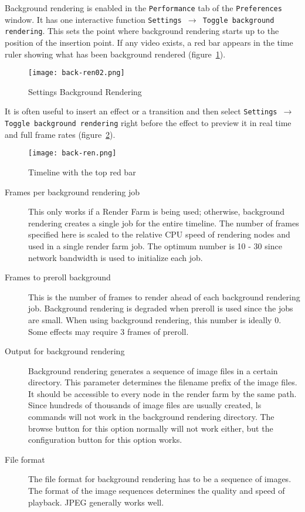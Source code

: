 Background rendering is enabled in the \texttt{Performance} tab of
the \texttt{Preferences} window. It has one interactive function
\texttt{Settings $\rightarrow$ Toggle background rendering}. This
sets the point where background rendering starts up to the position
of the insertion point. If any video exists, a red bar appears in
the time ruler showing what has been background rendered
(figure~\ref{fig:back-ren02}).

\begin{figure}[htpb] \centering
  \texttt{[image: back-ren02.png]}
  \caption{Settings Background Rendering}
  \label{fig:back-ren02}
\end{figure}

It is often useful to insert an effect or a transition and then
select \texttt{Settings $\rightarrow$ Toggle background rendering}
right before the effect to preview it in real time and full frame
rates (figure~\ref{fig:back-ren}).

\begin{figure}[htpb] \centering
  \texttt{[image: back-ren.png]}
  \caption{Timeline with the top red bar}
  \label{fig:back-ren}
\end{figure}

\begin{description}
\item[Frames per background rendering job] This only works if a
  Render Farm is being used; otherwise, background rendering creates a
  single job for the entire timeline. The number of frames specified
  here is scaled to the relative CPU speed of rendering nodes and used
  in a single render farm job. The optimum number is 10 - 30 since
  network bandwidth is used to initialize each job.
\item[Frames to preroll background] This is the number of frames to
  render ahead of each background rendering job. Background rendering
  is degraded when preroll is used since the jobs are small. When
  using background rendering, this number is ideally 0. Some effects
  may require 3 frames of preroll.
\item[Output for background rendering] Background rendering
  generates a sequence of image files in a certain directory. This
  parameter determines the filename prefix of the image files. It
  should be accessible to every node in the render farm by the same
  path. Since hundreds of thousands of image files are usually
  created, ls commands will not work in the background rendering
  directory. The browse button for this option normally will not work
  either, but the configuration button for this option works.
\item[File format] The file format for background rendering has to
  be a sequence of images. The format of the image sequences
  determines the quality and speed of playback. JPEG generally works
  well.
\end{description}

